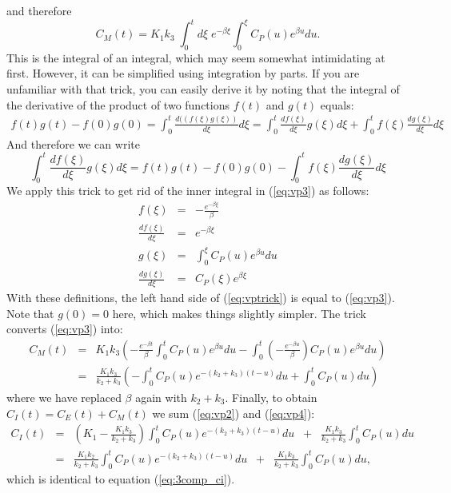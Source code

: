 and therefore
\begin{equation}
  C_M(t) = K_1 k_3 \; \int_0^t d\xi \; e^{-\beta \xi} 
       \int_0^\xi  C_P(u) e^{\beta u} du.   \label{eq:vp3}
\end{equation}
This is the integral of an integral, which may seem somewhat
intimidating at first. However, it can be simplified using integration
by parts. If you are unfamiliar with that trick, you can easily derive
it by noting that the integral of the derivative of the product of two
functions $f(t)$ and $g(t)$ equals:
\begin{align}
  f(t) g(t) - f(0) g(0) = \int_0^t \frac{d ((f(\xi) g(\xi))}{d\xi} d\xi
 = \int_0^t \frac{d f(\xi)}{d\xi} g(\xi) d\xi 
   +  \int_0^t f(\xi) \frac{d g(\xi)}{d\xi} d\xi
\end{align}
And therefore we can write
\begin{equation}
  \int_0^t \frac{d f(\xi)}{d\xi} g(\xi) d\xi = f(t) g(t) - f(0) g(0)
        - \int_0^t f(\xi) \frac{d g(\xi)}{d\xi} d\xi \label{eq:vptrick}
\end{equation}
We apply this trick to get rid of the inner integral in (\ref{eq:vp3})
as follows:
\begin{align}
  f(\xi) &=& -\frac{e^{-\beta \xi}}{\beta}\\
  \frac{d f(\xi)}{d\xi} &=& e^{-\beta\xi}\\
  g(\xi) &=& \int_0^\xi  C_P(u) e^{\beta u} du\\
  \frac{d g(\xi)}{d\xi} &=& C_P(\xi) e^{\beta \xi}
\end{align}
With these definitions, the left hand side of (\ref{eq:vptrick}) is
equal to (\ref{eq:vp3}). Note that $g(0) = 0$ here, which makes things
slightly simpler.  The trick converts (\ref{eq:vp3}) into:
\begin{align}
 C_M(t) &=& K_1 k_3 \left( 
  -\frac{e^{-\beta t}}{\beta} \int_0^t  C_P(u) e^{\beta u} du
  - \int_0^t (-\frac{e^{-\beta u}}{\beta}) C_P(u) e^{\beta u} du
   \right) \nonumber \\
 &=& \frac{K_1 k_3}{k_2 + k_3} \left(
   - \int_0^t C_P(u) e^{-(k_2 + k_3) (t -u)} du + \int_0^t C_P(u) du
 \right) \label{eq:vp4}
\end{align}
where we have replaced $\beta$ again with $k_2 + k_3$.
Finally, to obtain $C_I(t) = C_E(t) + C_M(t)$ we sum (\ref{eq:vp2})
and (\ref{eq:vp4}):
\begin{align}
C_I(t) &=& (K_1 - \frac{K_1 k_3}{k_2 + k_3}) 
            \int_0^t C_P(u) e^{- (k_2 + k_3) (t -u)} du \;\;
       + \;\; \frac{K_1 k_3}{k_2 + k_3} \int_0^t C_P(u) du \nonumber\\
 &=&
  \frac{K_1 k_2}{k_2 + k_3} \int_0^t C_P(u) e^{- (k_2 + k_3) (t -u)} du
    \;\; + \;\;
   \frac{K_1 k_3}{k_2 + k_3} \int_0^t C_P(u) du,
\end{align}
which is identical to equation (\ref{eq:3comp_ci}).

